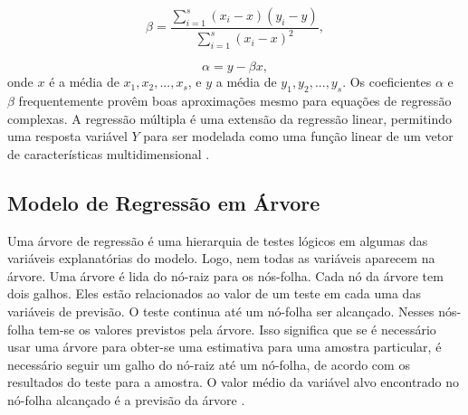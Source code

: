 \begin{equation}
\label{eq:betamlr}
\beta = \frac{\sum\limits_{i=1}^{s} (x_i - x) (y_i - y) }{\sum\limits_{i=1}^{s} (x_i - x)^2},
\end{equation}

\begin{equation}
\label{eq:alphamlr}
\alpha = y - \beta x,
\end{equation}
onde $x$ é a média de $x_1,x_2,...,x_s$, e $y$ a média de $y_1,y_2,...,y_s$. Os coeficientes $\alpha$ e $\beta$ frequentemente provêm boas aproximações mesmo para equações de regressão complexas. A regressão múltipla é uma extensão da regressão linear, permitindo uma resposta variável $Y$ para ser modelada como uma função linear de um vetor de características multidimensional \cite{han2006data}.

\subsection{Modelo de Regressão em Árvore}

Uma árvore de regressão é uma hierarquia de testes lógicos em algumas das variáveis explanatórias do modelo. Logo, nem todas as variáveis aparecem na árvore. Uma árvore é lida do nó-raiz para os nós-folha. Cada nó da árvore tem dois galhos. Eles estão relacionados ao valor de um teste em cada uma das variáveis de previsão. O teste continua até um nó-folha ser alcançado. Nesses nós-folha tem-se os valores previstos pela árvore. Isso significa que se é necessário usar uma árvore para obter-se uma estimativa para uma amostra particular, é necessário seguir um galho do nó-raiz até um nó-folha, de acordo com os resultados do teste para a amostra. O valor médio da variável alvo encontrado no nó-folha alcançado é a previsão da árvore \cite{torgo2003data} \cite{breiman1984classification}. 

